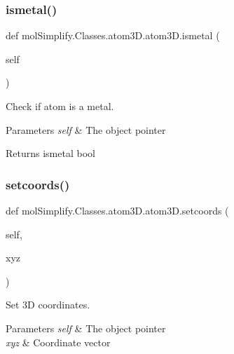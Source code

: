 \subsubsection{\texorpdfstring{ismetal()}{ismetal()}}
{\footnotesize\ttfamily def mol\+Simplify.\+Classes.\+atom3\+D.\+atom3\+D.\+ismetal (\begin{DoxyParamCaption}\item[{}]{self }\end{DoxyParamCaption})}



Check if atom is a metal. 


\begin{DoxyParams}{Parameters}
{\em self} & The object pointer \\
\hline
\end{DoxyParams}
\begin{DoxyReturn}{Returns}
ismetal bool 
\end{DoxyReturn}
\mbox{\label{classmolSimplify_1_1Classes_1_1atom3D_1_1atom3D_a402fcb74044e61763e222b07f8a5034b}} 
\subsubsection{\texorpdfstring{setcoords()}{setcoords()}}
{\footnotesize\ttfamily def mol\+Simplify.\+Classes.\+atom3\+D.\+atom3\+D.\+setcoords (\begin{DoxyParamCaption}\item[{}]{self,  }\item[{}]{xyz }\end{DoxyParamCaption})}



Set 3D coordinates. 


\begin{DoxyParams}{Parameters}
{\em self} & The object pointer \\
\hline
{\em xyz} & Coordinate vector \\
\hline
\end{DoxyParams}
\mbox{\label{classmolSimplify_1_1Classes_1_1atom3D_1_1atom3D_ab41e824da37c3ea6736d6804ff5f6dab}} 

